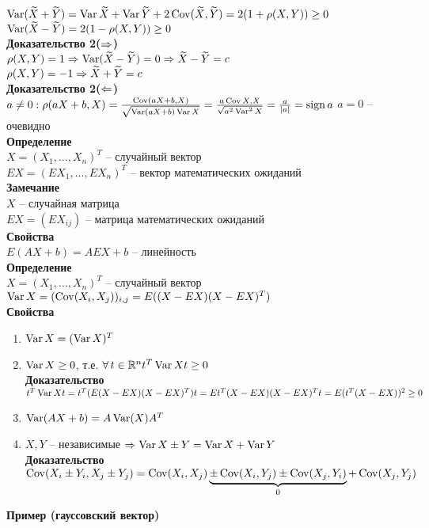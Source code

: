 \documentclass[12pt]{article}
\begin{document}
$\Var (\ot X + \ot Y) = \Var \ot X + \Var \ot Y + 2\Cov(\ot X, \ot Y) = 2(1 + \rho(X, Y)) \geq 0$\\
$\Var (\ot X - \ot Y) = 2(1 - \rho(X, Y)) \geq 0$\\
\textbf{Доказательство 2($\Rto$)}\\
$\rho(X, Y) = 1 \Rto \Var (\ot X - \ot Y) = 0 \Rto \ot X - \ot Y = c$\\
$\rho(X, Y) = -1 \Rto \ot X + \ot Y = c$\\
\textbf{Доказательство 2($\Lto$)}\\
$a \neq 0: \rho(aX+b, X) = \frac{\Cov(aX+b, X)}{\sqrt{\Var(aX + b)\Var X}} = \frac{a\Cov X,X}{\sqrt{a^2\Var^2 X}} = \frac{a}{|a|} = \sign a$
$a = 0$ -- очевидно\\
\textbf{Определение}\\
$X = (X_1, \ldots, X_n)^T$ -- случайный вектор\\
$EX = (EX_1, \ldots, EX_n)^T$ -- вектор математических ожиданий\\
\textbf{Замечание}\\
$X$ -- случайная матрица\\
$EX = (EX_{ij})$ -- матрица математических ожиданий\\
\textbf{Свойства}\\
$E(AX+b) = AEX + b$ -- линейность\\
\textbf{Определение}\\
$X = (X_1, \ldots, X_n)^T$ -- случайный вектор\\
$\Var X = (\Cov(X_i, X_j))_{i,j} = E((X-EX)(X-EX)^T)$\\
\textbf{Свойства}
\begin{enumerate}
    \item $\Var X = (\Var X)^T$
    \item $\Var X \geq 0$, т.е. $\fall t \in \Rset^n t^T \Var X t \geq 0$\\
    \textbf{Доказательство}\\
    $t^T \Var X t  = t^T(E(X-EX)(X-EX)^T)t = E t^T(X-EX)(X-EX)^Tt = E(t^T(X-EX))^2 \geq 0$
    \item $\Var (AX+b) = A\Var(X)A^T$
    \item $X, Y$ -- независимые $\Rto \Var X\pm Y = \Var X + \Var Y$\\
    \textbf{Доказательство}\\
    $\Cov (X_i \pm Y_i, X_j \pm Y_j) = \Cov(X_i, X_j) \ub{0}{\pm \Cov(X_i, Y_j) \pm \Cov(X_j, Y_i)} + \Cov(X_j, Y_j)$
\end{enumerate}
\textbf{Пример (гауссовский вектор)}\\
\end{document}
